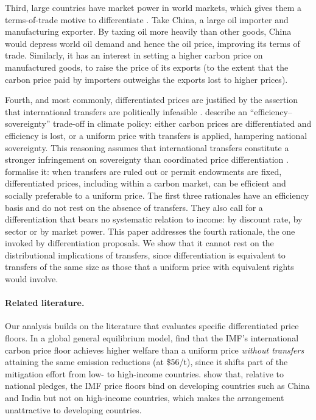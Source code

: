 \documentclass[12pt,english]{article}
\theoremstyle{remark}
\begin{document}
Third, large countries have market power in world markets, which gives them a terms-of-trade motive to differentiate \citep{babiker_climate_2005,boeters_optimally_2014}. Take China, a large oil importer and manufacturing exporter.
By taxing oil more heavily than other goods, China would depress world oil demand and hence the oil price, improving its terms of trade. Similarly, it has an interest in setting a higher carbon price on manufactured goods, to raise the price of its exports (to the extent that the carbon price paid by importers outweighs the exports lost to higher prices).

Fourth, and most commonly, differentiated prices are justified by the assertion that international transfers are politically infeasible \citep{parry_proposal_2021,young-brun_within-country_2025}. \citet{bauer_quantification_2020} describe an ``efficiency--sovereignty'' trade-off in climate policy: either carbon prices are differentiated and efficiency is lost, or a uniform price with transfers is applied, hampering national sovereignty. This reasoning assumes that international transfers constitute a stronger infringement on sovereignty than coordinated price differentiation \citep[see also][]{bekkers_comparing_2022}. \citet{fleurbaey_when_2025} formalise it: when transfers are ruled out or permit endowments are fixed, differentiated prices, including within a carbon market, can be efficient and socially preferable to a uniform price.
The first three rationales have an efficiency basis and do not rest on the absence of transfers. They also call for a differentiation that bears no systematic relation to income: by discount rate, by sector or by market power. This paper addresses the fourth rationale, the one invoked by differentiation proposals. We show that it cannot rest on the distributional implications of transfers, since differentiation is equivalent to transfers of the same size as those that a uniform price with equivalent rights would involve.

\paragraph{Related literature.}
Our analysis builds on the literature that evaluates specific differentiated price floors.
In a global general equilibrium model, \citet{chateau_global_2024} find that the IMF's international carbon price floor \citep{parry_proposal_2021} achieves higher welfare than a uniform price \textit{without transfers} attaining the same emission reductions (at \$56/t), since it shifts part of the mitigation effort from low- to high-income countries.
\citet{he_analysis_2024} show that, relative to national pledges, the IMF price floors bind on developing countries such as China and India but not on high-income countries, which makes the arrangement unattractive to developing countries.
\end{document}
